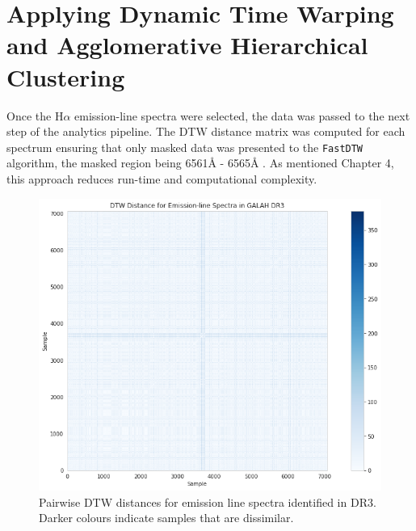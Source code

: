 \section{Applying Dynamic Time Warping and Agglomerative Hierarchical Clustering}

Once the H$\alpha$ emission-line spectra were selected, the data was passed to the next step of the analytics pipeline. The DTW distance matrix was computed for each spectrum ensuring that only masked data was presented to the \texttt{FastDTW} algorithm, the masked region being 6561\r{A} - 6565\r{A} \citep{traven2017galah}. As mentioned Chapter 4, this approach reduces run-time and computational complexity. 

\begin{figure}[!htb]
\centering
\includegraphics[scale=0.50]{figures/dtw distances dr3.png}
\caption{Pairwise DTW distances for emission line spectra identified in DR3. Darker colours indicate samples that are dissimilar.}
\end{figure}

